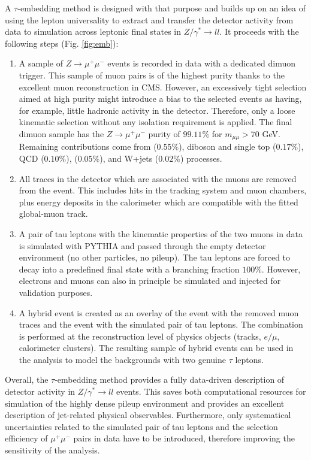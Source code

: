 A $\tau$-embedding method is designed with that purpose and builds up on an idea of using the lepton universality to extract and transfer the detector activity from data to simulation across leptonic final states in $Z/\gamma^* \to ll$. It proceeds with the following steps (Fig. \ref{fig:emb}):

\begin{enumerate}
    \item A sample of $Z\to \mu^+\mu^-$ events is recorded in data with a dedicated dimuon trigger. This sample of muon pairs is of the highest purity thanks to the excellent muon reconstruction in CMS. However, an excessively tight selection aimed at high purity might introduce a bias to the selected events as having, for example, little hadronic activity in the detector. Therefore, only a loose kinematic selection without any isolation requirement is applied. The final dimuon sample has the $Z\to \mu^+\mu^-$ purity of $99.11\%$ for $m_{\mu\mu} > 70$ GeV. Remaining contributions come from \ttbar ($0.55\%$), diboson and single top ($0.17\%$), QCD ($0.10\%$), \ztt ($0.05\%$), and W+jets ($0.02\%$) processes. 
    
    \item All traces in the detector which are associated with the muons are removed from the event. This includes hits in the tracking system and muon chambers, plus energy deposits in the calorimeter which are compatible with the fitted global-muon track. 
    
    \item A pair of tau leptons with the kinematic properties of the two muons in data is simulated with PYTHIA and passed through the empty detector environment (no other particles, no pileup). The tau leptons are forced to decay into a predefined \et final state with a branching fraction $100\%$. However, electrons and muons can also in principle be simulated and injected for validation purposes. 
    
    \item A hybrid event is created as an overlay of the event with the removed muon traces and the event with the simulated pair of tau leptons. The combination is performed at the reconstruction level of physics objects (tracks, $e/\mu$, calorimeter clusters). The resulting sample of hybrid events can be used in the analysis to model the backgrounds with two genuine $\tau$ leptons.

\end{enumerate}
 
 Overall, the $\tau$-embedding method provides a fully data-driven description of detector activity in $Z/\gamma^* \to ll$ events. This saves both computational resources for simulation of the highly dense pileup environment and provides an excellent description of jet-related physical observables. Furthermore, only systematical uncertainties related to the simulated pair of tau leptons and the selection efficiency of $\mu^+\mu^-$ pairs in data have to be introduced, therefore improving the sensitivity of the analysis. 

